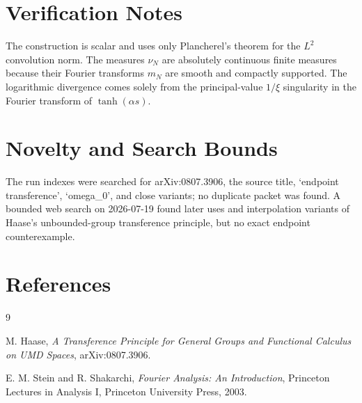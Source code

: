 \documentclass[11pt]{article}
\begin{document}
\section*{Verification Notes}

The construction is scalar and uses only Plancherel's theorem for the
\(L^2\) convolution norm. The measures \(\nu_N\) are absolutely continuous
finite measures because their Fourier transforms \(m_N\) are smooth and
compactly supported. The logarithmic divergence comes solely from the
principal-value \(1/\xi\) singularity in the Fourier transform of
\(\tanh(\alpha s)\).

\section*{Novelty and Search Bounds}

The run indexes were searched for arXiv:0807.3906, the source title,
`endpoint transference', `omega\_0', and close variants; no duplicate packet
was found. A bounded web search on 2026-07-19 found later uses and
interpolation variants of Haase's unbounded-group transference principle, but
no exact endpoint counterexample.

\section*{References}

\begin{thebibliography}{9}

M. Haase,
\emph{A Transference Principle for General Groups and Functional Calculus on
UMD Spaces},
arXiv:0807.3906.

E. M. Stein and R. Shakarchi,
\emph{Fourier Analysis: An Introduction},
Princeton Lectures in Analysis I, Princeton University Press, 2003.

\end{thebibliography}
\end{document}
